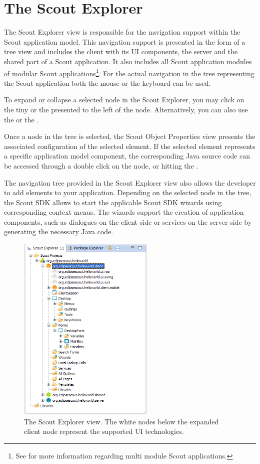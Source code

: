 \documentclass[a4paper,10pt,twoside]{book}
\begin{document}
\section{The Scout Explorer}

The Scout Explorer view is responsible for the navigation support within the Scout application model. 
This navigation support is presented in the form of a tree view and includes the client with its UI components, the server and the shared part of a Scout application. 
It also includes all Scout application modules of modular Scout applications\footnote{
See  for more information regarding multi module Scout applications.
}.
For the actual navigation in the tree representing the Scout application both the mouse or the keyboard can be used. 

To expand or collapse a selected node in the Scout Explorer, you may click on the tiny  or the  presented to the left of the node.
Alternatively, you can also use the  or the .

Once a node in the tree is selected, the Scout Object Properties view presents the associated configuration of the selected element. 
If the selected element represents a specific application model component, the corresponding Java source code can be accessed through a double click on the node, or hitting the . 

The navigation tree provided in the Scout Explorer view also allows the developer to add elements to your application.
Depending on the selected node in the tree, the Scout SDK allows to start the applicable Scout SDK wizards using corresponding context menus. 
The wizards support the creation of application components, such as dialogues on the client side or services on the server side by generating the necessary Java code.

\begin{figure}
\includegraphics[width=6.5cm]{explorer_client.png} 
\caption{The Scout Explorer view. The white nodes below the expanded client node represent the supported UI technologies.}
\end{figure}
\end{document}
